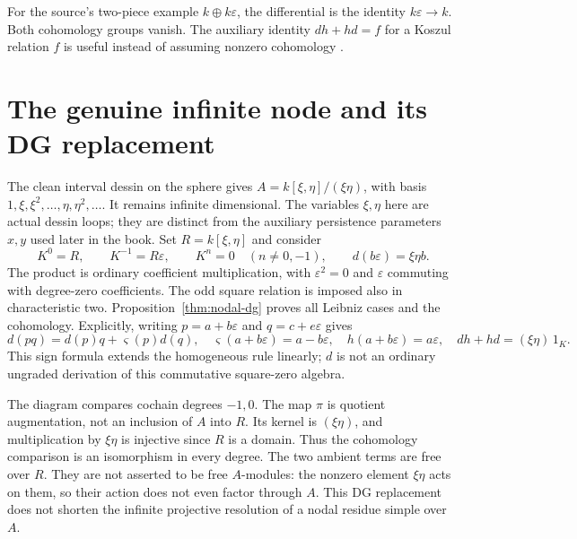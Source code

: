 \documentclass[11pt,oneside,openany]{book}
\theoremstyle{definition}\newtheorem{definition}[theorem]{Definition}
\theoremstyle{remark}\newtheorem{remark}[theorem]{Remark}
\begin{document}
For the source's two-piece example $k\oplus k\varepsilon$, the differential
is the identity $k\varepsilon\to k$. Both cohomology groups vanish.
The auxiliary identity $dh+hd=f$ for a Koszul relation $f$ is useful
instead of assuming nonzero cohomology \cite{StacksKoszulDG}.

\section{The genuine infinite node and its DG replacement}
The clean interval dessin on the sphere gives
$A=k[\xi,\eta]/(\xi\eta)$, with basis
$1,\xi,\xi^2,\ldots,\eta,\eta^2,\ldots$. It remains infinite dimensional.
The variables $\xi,\eta$ here are actual dessin loops; they are distinct
from the auxiliary persistence parameters $x,y$ used later in the book.
Set $R=k[\xi,\eta]$ and consider
\[
 K^0=R,\qquad K^{-1}=R\varepsilon,\qquad K^n=0\quad(n\ne0,-1),
 \qquad d(b\varepsilon)=\xi\eta b.
\]
The product is ordinary coefficient multiplication, with
$\varepsilon^2=0$ and $\varepsilon$ commuting with degree-zero coefficients.
The odd square relation is imposed also in characteristic two.
Proposition~\ref{thm:nodal-dg} proves all Leibniz cases and the cohomology.
Explicitly, writing $p=a+b\varepsilon$ and $q=c+e\varepsilon$ gives
\[
 d(pq)=d(p)q+\varsigma(p)d(q),\quad
 \varsigma(a+b\varepsilon)=a-b\varepsilon,\quad
 h(a+b\varepsilon)=a\varepsilon,\quad dh+hd=(\xi\eta)\,1_K.
\]
This sign formula extends the homogeneous rule linearly; $d$ is not an
ordinary ungraded derivation of this commutative square-zero algebra.

\begin{center}
\end{center}
The diagram compares cochain degrees $-1,0$. The map $\pi$ is quotient
augmentation, not an inclusion of $A$ into $R$. Its kernel is $(\xi\eta)$,
and multiplication by $\xi\eta$ is injective since $R$ is a domain.
Thus the cohomology comparison is an isomorphism in every degree.
The two ambient terms are free over $R$. They are not asserted to be free
$A$-modules: the nonzero element $\xi\eta$ acts on them, so their action
does not even factor through $A$. This DG replacement does not shorten the
infinite projective resolution of a nodal residue simple over $A$.
\end{document}
